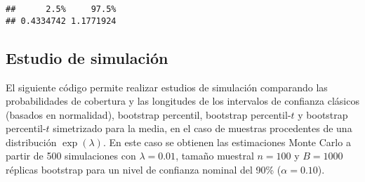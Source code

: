 \documentclass[
]{book}
\newenvironment{Shaded}{\begin{snugshade}}{\end{snugshade}}
\newcommand{\CommentTok}[1]{\textcolor[rgb]{0.56,0.35,0.01}{\textit{#1}}}
\newcommand{\DecValTok}[1]{\textcolor[rgb]{0.00,0.00,0.81}{#1}}
\newcommand{\KeywordTok}[1]{\textcolor[rgb]{0.13,0.29,0.53}{\textbf{#1}}}
\newcommand{\NormalTok}[1]{#1}
\newcommand{\OperatorTok}[1]{\textcolor[rgb]{0.81,0.36,0.00}{\textbf{#1}}}
\newcommand{\StringTok}[1]{\textcolor[rgb]{0.31,0.60,0.02}{#1}}
\theoremstyle{break}
\theoremstyle{definition}
\theoremstyle{definition}
\theoremstyle{definition}
\theoremstyle{remark}
\begin{document}
\begin{Shaded}
\end{Shaded}

\begin{verbatim}
##      2.5%     97.5% 
## 0.4334742 1.1771924
\end{verbatim}

\hypertarget{estudio-sim-exp}{%
\subsection{Estudio de simulación}\label{estudio-sim-exp}}

El siguiente código permite realizar estudios de
simulación comparando las probabilidades de cobertura y las longitudes
de los intervalos de confianza clásicos (basados en normalidad),
bootstrap percentil, bootstrap percentil-\(t\) y bootstrap percentil-\(t\)
simetrizado para la media, en el caso de muestras procedentes de una
distribución \(\exp \left( \lambda \right)\).
En este caso se obtienen las estimaciones Monte Carlo a partir de 500
simulaciones con \(\lambda = 0.01\), tamaño muestral \(n=100\) y \(B=1000\) réplicas
bootstrap para un nivel de confianza nominal del 90\% (\(\alpha =0.10\)).
\end{document}
